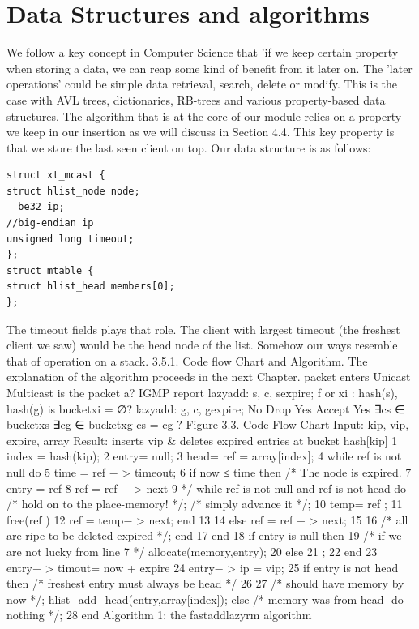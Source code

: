 \documentclass[11pt,left=2cm,bottom=2cm,oneside]{book}
\begin{document}
\section{Data Structures and algorithms}
We follow a key concept in Computer Science that 'if we keep certain property
when storing a data, we can reap some kind of benefit from it later on. The 'later
operations' could be simple data retrieval, search, delete or modify. This is the case
with AVL trees, dictionaries, RB-trees and various property-based data structures.
The algorithm that is at the core of our module relies on a property we keep in our
insertion as we will discuss in Section 4.4. This key property is that we store the
last seen client on top. Our data structure is as follows:
\begin{verbatim}
struct xt_mcast {
struct hlist_node node;
__be32 ip;
//big-endian ip
unsigned long timeout;
};
struct mtable {
struct hlist_head members[0];
};
\end{verbatim}
The timeout fields plays that role. The client with largest timeout (the freshest
client we saw) would be the head node of the list. Somehow our ways resemble that
of operation on a stack.
3.5.1. Code flow Chart and Algorithm. The explanation of the algorithm
proceeds in the next Chapter.
packet
enters
Unicast
Multicast
is the
packet a?
IGMP report
lazyadd:
s, c, sexpire;
f or xi :
hash(s), hash(g)
is bucketxi =
∅?
lazyadd:
g, c, gexpire;
No
Drop
Yes
Accept
Yes
∃cs ∈
bucketxs
∃cg ∈
bucketxg
cs = cg ?
Figure 3.3. Code Flow Chart
Input: kip, vip, expire, array
Result: inserts vip \& deletes expired entries at bucket hash[kip]
1 index = hash(kip);
2 entry= null;
3 head= ref = array[index];
4 while ref is not null do
5 time = ref − > timeout;
6 if now ≤ time then
/* The node is expired.
7 entry = ref
8 ref = ref − > next
9 
*/
while ref is not null and ref is not head do
/* hold on to the place-memory!
*/;
/* simply advance it */;
10 temp= ref ;
11 free(ref )
12 ref = temp− > next;
end
13
14
else
ref = ref − > next;
15
16
/* all are ripe to be deleted-expired */;
end
17 end
18 if entry is null then
19
/* if we are not lucky from line 7 */
allocate(memory,entry);
20 else
21 ;
22 end
23 entry− > timout= now + expire
24 entry− > ip = vip;
25 if entry is not head then /* freshest entry must always be head */
26
27
/* should have memory by now */;
hlist\_add\_head(entry,array[index]);
else
/* memory was from head- do nothing */;
28
end
Algorithm 1: the fastaddlazyrm algorithm






\end{document}
